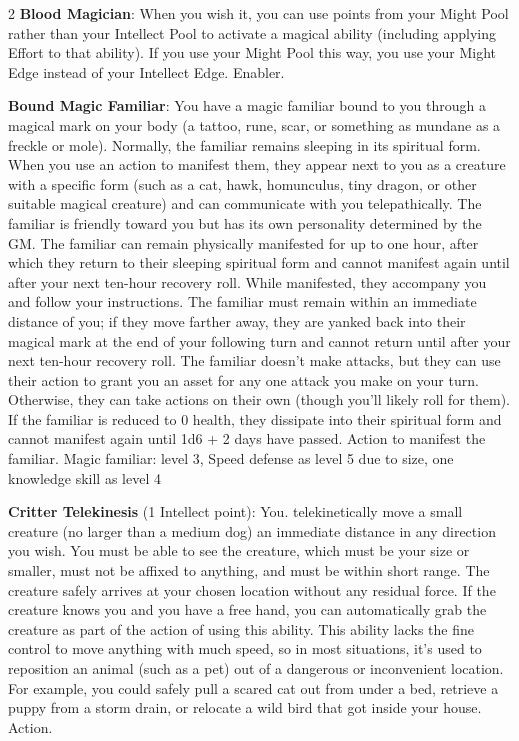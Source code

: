 \begin{multicols}{2}
\textbf{Blood Magician}: When you wish it, you can use points from your Might Pool rather than your Intellect Pool to activate a magical ability (including applying Effort to that ability). If you use your Might Pool this way, you use your Might Edge instead of your Intellect Edge. Enabler.

\textbf{Bound Magic Familiar}: You have a magic familiar bound to you through a magical mark on your body (a tattoo, rune, scar, or something as mundane as a freckle or mole). Normally, the familiar remains sleeping in its spiritual form. When you use an action to manifest them, they appear next to you as a creature with a specific form (such as a cat, hawk, homunculus, tiny dragon, or other suitable magical creature) and can communicate with you telepathically. The familiar is friendly toward you but has its own personality determined by the GM. The familiar can remain physically manifested for up to one hour, after which they return to their sleeping spiritual form and cannot manifest again until after your next ten-hour recovery roll. While manifested, they accompany you and follow your instructions. The familiar must remain within an immediate distance of you; if they move farther away, they are yanked back into their magical mark at the end of your following turn and cannot return until after your next ten-hour recovery roll. The familiar doesn’t make attacks, but they can use their action to grant you an asset for any one attack you make on your turn. Otherwise, they can take actions on their own (though you’ll likely roll for them). If the familiar is reduced to 0 health, they dissipate into their spiritual form and cannot manifest again until 1d6 + 2 days have passed. Action to manifest the familiar.
 Magic familiar: level 3, Speed defense as level 5 due to size, one knowledge skill as level 4

\textbf{Critter Telekinesis} (1 Intellect point): You. telekinetically move a small creature (no larger than a medium dog) an immediate distance in any direction you wish. You must be able to see the creature, which must be your size or smaller, must not be affixed to anything, and must be within short range. The creature safely arrives at your chosen location without any residual force. If the creature knows you and you have a free hand, you can automatically grab the creature as part of the action of using this ability. This ability lacks the fine control to move anything with much speed, so in most situations, it’s used to reposition an animal (such as a pet) out of a dangerous or inconvenient location. For example, you could safely pull a scared cat out from under a bed, retrieve a puppy from a storm drain, or relocate a wild bird that got inside your house. Action.


\end{multicols}
